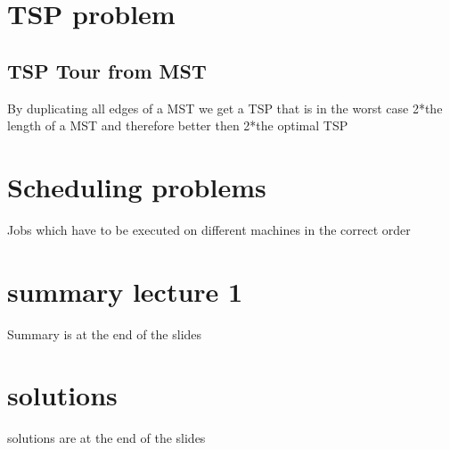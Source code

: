 \documentclass[12pt]{article}
\begin{document}
\section*{TSP problem}
\subsection*{TSP Tour from MST}
By duplicating all edges of a MST we get a TSP that is in the worst case 2*the length of a MST and therefore better then 2*the optimal TSP
\section*{Scheduling problems}
Jobs which have to be executed on different machines in the correct order
\section*{summary lecture 1}
Summary is at the end of the slides
\section*{solutions}
solutions are at the end of the slides
\end{document}
